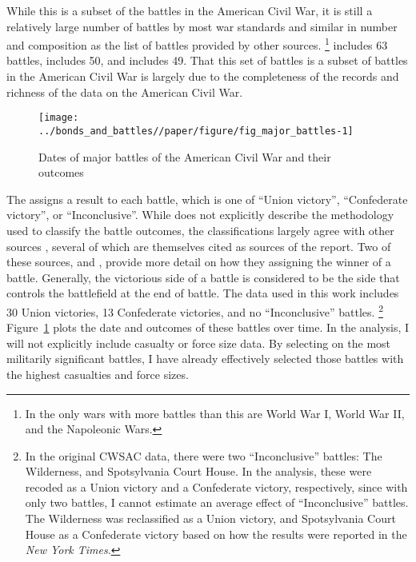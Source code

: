 While this is a subset of the battles in the American Civil War, it is still a relatively large number of battles by most war standards and similar in number and composition as the list of battles provided by other sources.%
\footnote{In \textcite{cdb90} the only wars with more battles than this are World War I, World War II, and the Napoleonic Wars.}
\textcite{Livermore1900} includes 63 battles, \textcite{Bodart1908} includes 50, and \textcite{cdb90} includes 49.
That this set of battles is a subset of battles in the  American Civil War is largely due to the completeness of the records and richness of the data on the American Civil War.

\begin{figure}[!htpb]
  \centering
  \texttt{[image: ../bonds\_and\_battles//paper/figure/fig\_major\_battles-1]}
  \caption{Dates of major battles of the American Civil War and their outcomes}
  \label{bonds:fig:major_battles}
\end{figure}

The \textcite{CWSAC1993b} assigns a result to each battle, which is one of ``Union victory'', ``Confederate victory'', or ``Inconclusive''.
While \textcite{CWSAC1993} does not explicitly describe the methodology used to classify the battle outcomes, the classifications largely agree with other sources \parencites{fox1898regimental}{Livermore1900}{Bodart1908}{cdb90}, several of which are themselves cited as sources of the report.
Two of these sources, \textcite{fox1898regimental} and \textcite{Livermore1900}, provide more detail on how they assigning the winner of a battle.
Generally, the victorious side of a battle is considered to be the side that controls the battlefield at the end of battle.
The data used in this work includes 30 Union victories, 13 Confederate victories, and no ``Inconclusive'' battles.%
\footnote{
  In the original CWSAC data, there were two ``Inconclusive'' battles: The Wilderness, and Spotsylvania Court House.
  In the analysis, these were recoded as a Union victory and a Confederate victory, respectively, since with only two battles, I cannot estimate an average effect of ``Inconclusive'' battles.
  The Wilderness was reclassified as a Union victory, and Spotsylvania Court House as a Confederate victory based on how the results were reported in the \textit{New York Times}.
}
Figure~\ref{bonds:fig:major_battles} plots the date and outcomes of these battles over time.
In the analysis, I will not explicitly include casualty or force size data.
By selecting on the most militarily significant battles, I have already effectively selected those battles with the highest casualties and force sizes.

